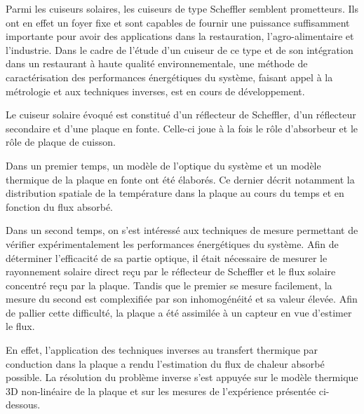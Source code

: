 {\normalsize
Parmi les cuiseurs solaires, les cuiseurs de type Scheffler semblent prometteurs. Ils ont en effet un foyer fixe et sont capables de fournir une puissance suffisamment importante pour avoir des applications dans la restauration, l'agro-alimentaire et l'industrie. Dans le cadre de l'étude d'un cuiseur de ce type et de son intégration dans un restaurant à haute qualité environnementale, une méthode de caractérisation des performances énergétiques du système, faisant appel à la métrologie et aux techniques inverses, est en cours de développement.







Le cuiseur solaire évoqué est constitué d'un réflecteur de Scheffler, d'un réflecteur secondaire et d'une plaque en fonte. Celle-ci joue à la fois le rôle d'absorbeur et le rôle de plaque de cuisson.







Dans un premier temps, un modèle de l'optique du système et un modèle thermique de la plaque en fonte ont été élaborés. Ce dernier décrit notamment la distribution spatiale de la température dans la plaque au cours du temps et en fonction du flux absorbé.







Dans un second temps, on s'est intéressé aux techniques de mesure permettant de vérifier expérimentalement les performances énergétiques du système. Afin de déterminer l'efficacité de sa partie optique, il était nécessaire de mesurer le rayonnement solaire direct reçu par le réflecteur de Scheffler et le flux solaire concentré reçu par la plaque. Tandis que le premier se mesure facilement, la mesure du second est complexifiée par son inhomogénéité et sa valeur élevée. Afin de pallier cette difficulté, la plaque a été assimilée à un capteur en vue d'estimer le flux.







En effet, l'application des techniques inverses au transfert thermique par conduction dans la plaque a rendu l'estimation du flux de chaleur absorbé possible. La résolution du problème inverse s'est appuyée sur le modèle thermique 3D non-linéaire de la plaque et sur les mesures de l'expérience présentée ci-dessous.







}
